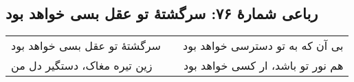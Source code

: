 \begin{center}
\section*{رباعی شمارهٔ ۷۶: سرگشتۀ تو عقل بسی خواهد بود}
\label{sec:076}
\begin{longtable}{l p{0.5cm} r}
سرگشتهٔ تو عقل بسی خواهد بود
&&
بی آن که به تو دسترسی خواهد بود
\\
زین تیره مغاک، دستگیر دل من
&&
هم نور تو باشد، ار کسی خواهد بود
\\
\end{longtable}
\end{center}
